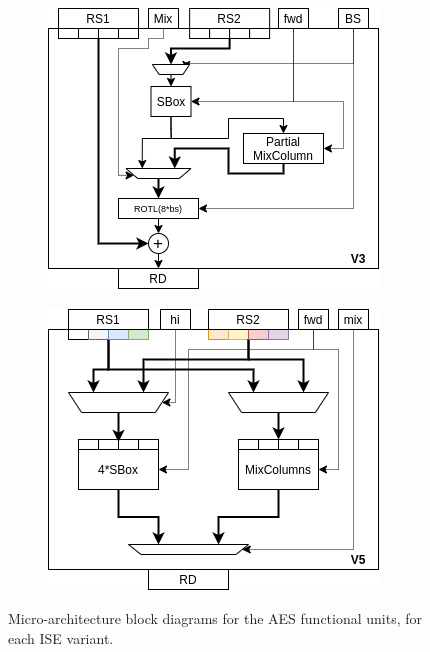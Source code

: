 \begin{figure}
\begin{subfigure}[t]{0.40\textwidth}
    \centering
    \includegraphics[width=\textwidth]{diagrams/ise-datapath-v3.png}
    \caption{}
    \label{fig:design:fu_block:v3}
\end{subfigure}
\begin{subfigure}[t]{0.40\textwidth}
    \centering
    \includegraphics[width=\textwidth]{diagrams/ise-datapath-v5.png}
    \caption{}
    \label{fig:design:fu_block:v5}
\end{subfigure}

\caption{
Micro-architecture block diagrams for the AES functional units, for
each ISE variant.
}
\end{figure}

